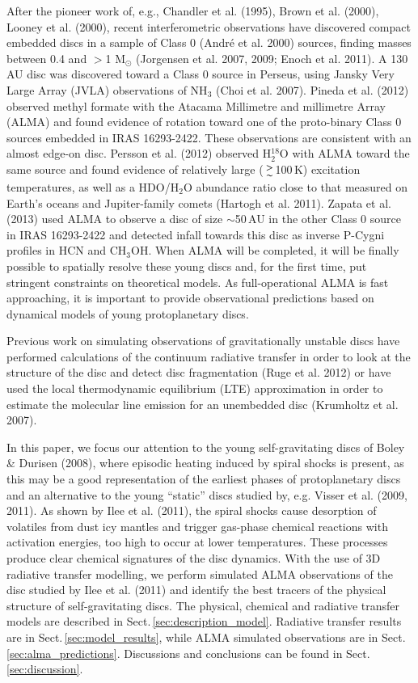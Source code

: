 \documentclass[useAMS,usenatbib]{mn2e}
\begin{document}
After the pioneer work of, e.g., Chandler et al. (1995), Brown et al. (2000), Looney et al. (2000), recent interferometric observations have discovered compact embedded discs in a sample of Class 0 (Andr\'e et al. 2000) sources, finding masses between 0.4 and  $>$1 M$_{\odot}$ (Jorgensen et al. 2007, 2009; Enoch et al. 2011). A 130\,AU disc was discovered toward a Class 0 source in Perseus, using Jansky Very Large Array (JVLA) observations of NH$_3$ (Choi et al. 2007). Pineda et al. (2012) observed methyl formate with the Atacama Millimetre and millimetre Array (ALMA) and found evidence of rotation toward one of the proto-binary Class 0 sources embedded in IRAS 16293-2422. These observations are consistent with an almost edge-on disc. Persson et al. (2012) observed H$_2^{18}$O with ALMA toward the same source and found evidence of relatively large ($\ga$100\,K) excitation temperatures, as well as a HDO/H$_2$O abundance ratio close to that measured on Earth's oceans and Jupiter-family comets (Hartogh et al. 2011). Zapata et al. (2013) used ALMA to observe a disc of size $\sim$50$\,$AU in the other Class 0 source in IRAS 16293-2422 and detected infall towards this disc as inverse P-Cygni profiles in HCN and CH$_3$OH. When ALMA will be completed, it will be finally possible to spatially resolve these young discs and, for the first time, put stringent constraints on theoretical models. As full-operational ALMA is fast approaching, it is important to provide observational predictions based on dynamical models of young protoplanetary discs.

Previous work on simulating observations of gravitationally unstable discs have performed calculations of the continuum radiative transfer in order to look at the structure of the disc and detect disc fragmentation (Ruge et al. 2012) or have used the local thermodynamic equilibrium (LTE) approximation in order to estimate the molecular line emission for an unembedded disc (Krumholtz et al. 2007). 

In this paper, we focus our attention to the young self-gravitating discs of Boley \& Durisen (2008), where episodic heating induced by spiral shocks is present, as this may be a good representation of the earliest phases of protoplanetary discs and an alternative to the young ``static'' discs studied by, e.g. Visser et al. (2009, 2011). As shown by Ilee et al. (2011), the spiral shocks cause desorption of volatiles from dust icy mantles and trigger gas-phase chemical reactions with activation energies, too high to occur at lower temperatures. These processes produce clear chemical signatures of the disc dynamics. With the use of 3D radiative transfer modelling, we perform simulated ALMA observations of the disc studied by Ilee et al. (2011) and identify the best tracers of the physical structure of self-gravitating discs. The physical, chemical and radiative transfer models are described in Sect.\,\ref{sec:description_model}. Radiative transfer results are in Sect.\,\ref{sec:model_results}, while ALMA simulated observations are in Sect.\,\ref{sec:alma_predictions}. Discussions and conclusions can be found in Sect.\,\ref{sec:discussion}. 
\end{document}
